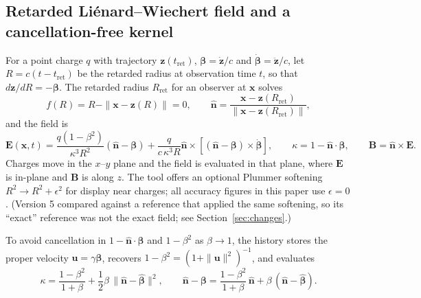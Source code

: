 \documentclass[11pt, a4paper]{article}
\begin{document}
\subsection{Retarded Li\'enard--Wiechert field and a cancellation-free kernel}
For a point charge $q$ with trajectory $\mathbf{z}(t_{\text{ret}})$, $\boldsymbol{\beta} = \dot{\mathbf{z}}/c$ and $\dot{\boldsymbol{\beta}} = \ddot{\mathbf{z}}/c$, let $R = c(t - t_{\text{ret}})$ be the retarded radius at observation time $t$, so that $d\mathbf{z}/dR = -\boldsymbol{\beta}$. The retarded radius $R_{\text{ret}}$ for an observer at $\mathbf{x}$ solves
\begin{equation}
f(R) = R - \|\mathbf{x} - \mathbf{z}(R)\| = 0, \qquad \hat{\mathbf{n}} = \frac{\mathbf{x} - \mathbf{z}(R_{\text{ret}})}{\|\mathbf{x} - \mathbf{z}(R_{\text{ret}})\|},
\label{eq:rootfn}
\end{equation}
and the field is \cite{jackson1999}
\begin{equation}
\mathbf{E}(\mathbf{x}, t) = \frac{q(1 - \beta^2)}{\kappa^3 R^2}(\hat{\mathbf{n}} - \boldsymbol{\beta}) + \frac{q}{c\,\kappa^3 R}\hat{\mathbf{n}} \times \left[(\hat{\mathbf{n}} - \boldsymbol{\beta}) \times \dot{\boldsymbol{\beta}}\right], \qquad \kappa = 1 - \hat{\mathbf{n}}\cdot\boldsymbol{\beta}, \qquad \mathbf{B} = \hat{\mathbf{n}} \times \mathbf{E}.
\label{eq:lw}
\end{equation}
Charges move in the $x$--$y$ plane and the field is evaluated in that plane, where $\mathbf{E}$ is in-plane and $\mathbf{B}$ is along $z$. The tool offers an optional Plummer softening $R^2 \to R^2 + \epsilon^2$ for display near charges; all accuracy figures in this paper use $\epsilon = 0$. (Version 5 compared against a reference that applied the same softening, so its ``exact'' reference was not the exact field; see Section~\ref{sec:changes}.)

To avoid cancellation in $1 - \hat{\mathbf{n}}\cdot\boldsymbol{\beta}$ and $1 - \beta^2$ as $\beta \to 1$, the history stores the proper velocity $\mathbf{u} = \gamma\boldsymbol{\beta}$, recovers $1 - \beta^2 = (1 + \|\mathbf{u}\|^2)^{-1}$, and evaluates
\begin{equation}
\kappa = \frac{1 - \beta^2}{1 + \beta} + \frac{1}{2}\beta\,\|\hat{\mathbf{n}} - \hat{\boldsymbol{\beta}}\|^2, \qquad \hat{\mathbf{n}} - \boldsymbol{\beta} = \frac{1 - \beta^2}{1 + \beta}\,\hat{\mathbf{n}} + \beta\,(\hat{\mathbf{n}} - \hat{\boldsymbol{\beta}}).
\label{eq:kappa}
\end{equation}
\end{document}

